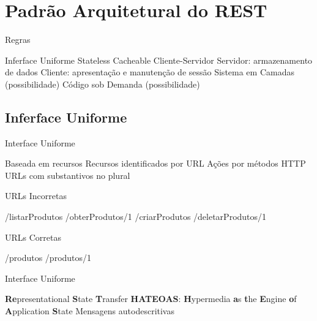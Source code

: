 \documentclass{beamer}
\begin{document}
\section{Padrão Arquitetural do REST}

\begin{frame}{Regras}
  \begin{outline}
     Inferface Uniforme
     Stateless
     Cacheable
     Cliente-Servidor
      \2 Servidor: armazenamento de dados
      \2 Cliente: apresentação e manutenção de sessão
     Sistema em Camadas (possibilidade)
     Código sob Demanda (possibilidade)
  \end{outline}
\end{frame}

\subsection{Inferface Uniforme}

\begin{frame}{Interface Uniforme}
  \begin{outline}
     Baseada em \alert{recursos}
     Recursos identificados por URL
     Ações por métodos HTTP
     URLs com substantivos no plural
  \end{outline}
\end{frame}

\begin{frame}{URLs Incorretas}
  \begin{outline}
    \1 /listarProdutos
    \1 /obterProdutos/1
    \1 /criarProdutos
    \1 /deletarProdutos/1
  \end{outline}
\end{frame}

\begin{frame}{URLs Corretas}
  \begin{outline}
    \1 /produtos
    \1 /produtos/1
  \end{outline}
\end{frame}

\begin{frame}{Interface Uniforme}
  \begin{outline}
     \textbf{Re}presentational \textbf{S}tate \textbf{T}ransfer
     \textbf{HATEOAS}: \textbf{H}ypermedia \textbf{a}s \textbf{t}he \textbf{E}ngine \textbf{o}f \textbf{A}pplication \textbf{S}tate 
     Mensagens autodescritivas
  \end{outline}
\end{frame}
\end{document}
